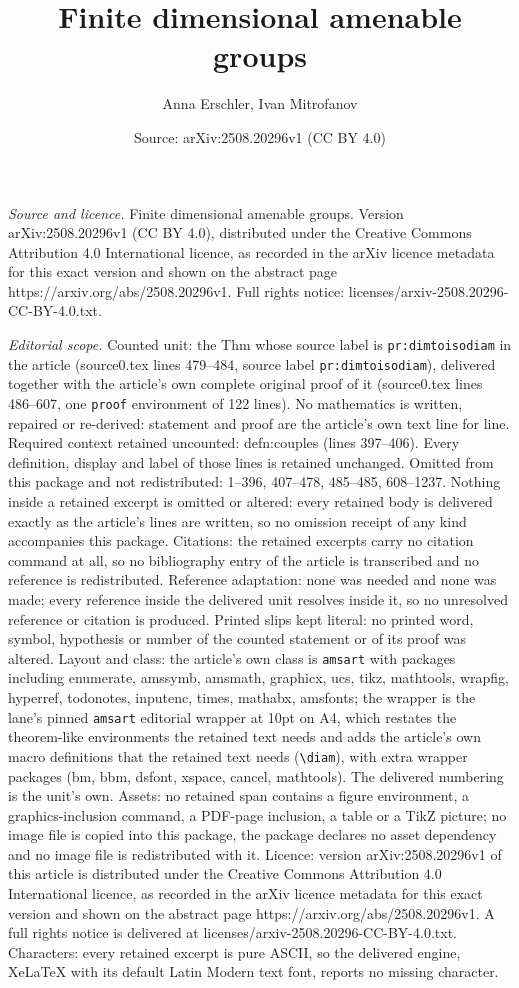 \documentclass[10pt,a4paper]{amsart}
\title[Finite dimensional amenable groups]{Finite dimensional amenable groups}
\author{Anna Erschler, Ivan Mitrofanov}
\date{Source: arXiv:2508.20296v1 (CC BY 4.0)}
\begin{document}
\maketitle

\noindent\emph{Source and licence.} Finite dimensional amenable groups. Version arXiv:2508.20296v1 (CC BY 4.0), distributed under the Creative Commons Attribution 4.0 International licence, as recorded in the arXiv licence metadata for this exact version and shown on the abstract page https://arxiv.org/abs/2508.20296v1. Full rights notice: licenses/arxiv-2508.20296-CC-BY-4.0.txt.\par\smallskip

\noindent\textit{Editorial scope.} Counted unit: the Thm whose source label is \texttt{pr:dimtoisodiam} in the article (source0.tex lines 479--484, source label \texttt{pr:dimtoisodiam}), delivered together with the article's own complete original proof of it (source0.tex lines 486--607, one \texttt{proof} environment of 122 lines). No mathematics is written, repaired or re-derived: statement and proof are the article's own text line for line. Required context retained uncounted: defn:couples (lines 397--406). Every definition, display and label of those lines is retained unchanged. Omitted from this package and not redistributed: 1--396, 407--478, 485--485, 608--1237. Nothing inside a retained excerpt is omitted or altered: every retained body is delivered exactly as the article's lines are written, so no omission receipt of any kind accompanies this package. Citations: the retained excerpts carry no citation command at all, so no bibliography entry of the article is transcribed and no reference is redistributed. Reference adaptation: none was needed and none was made; every reference inside the delivered unit resolves inside it, so no unresolved reference or citation is produced. Printed slips kept literal: no printed word, symbol, hypothesis or number of the counted statement or of its proof was altered. Layout and class: the article's own class is \texttt{amsart} with packages including enumerate, amssymb, amsmath, graphicx, ucs, tikz, mathtools, wrapfig, hyperref, todonotes, inputenc, times, mathabx, amsfonts; the wrapper is the lane's pinned \texttt{amsart} editorial wrapper at 10pt on A4, which restates the theorem-like environments the retained text needs and adds the article's own macro definitions that the retained text needs (\texttt{\textbackslash diam}), with extra wrapper packages (bm, bbm, dsfont, xspace, cancel, mathtools). The delivered numbering is the unit's own. Assets: no retained span contains a figure environment, a graphics-inclusion command, a PDF-page inclusion, a table or a TikZ picture; no image file is copied into this package, the package declares no asset dependency and no image file is redistributed with it. Licence: version arXiv:2508.20296v1 of this article is distributed under the Creative Commons Attribution 4.0 International licence, as recorded in the arXiv licence metadata for this exact version and shown on the abstract page https://arxiv.org/abs/2508.20296v1. A full rights notice is delivered at licenses/arxiv-2508.20296-CC-BY-4.0.txt. Characters: every retained excerpt is pure ASCII, so the delivered engine, XeLaTeX with its default Latin Modern text font, reports no missing character.
\end{document}
